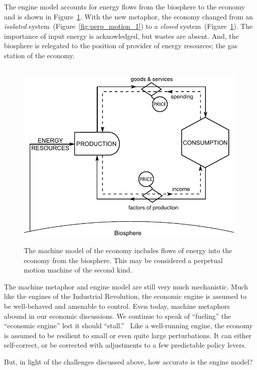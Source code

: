 The engine model accounts for energy flows from the biosphere 
to the economy and is shown in Figure~\ref{fig:perp_motion_2}.
With the new metaphor, the economy changed from 
an \emph{isolated} system~(Figure~\ref{fig:perp_motion_1}) to 
a \emph{closed} system~(Figure~\ref{fig:perp_motion_2}). 
The importance of input energy is acknowledged, 
but wastes are absent.
And, the biosphere is relegated to the position
of provider of energy resources;
the gas station of the economy.\cite{Norgaard2010}

\begin{figure}[H]
\centering\
\includegraphics[width=\linewidth]{Part_0/Chapter_Introduction/images/Perpetual_motion_2.pdf}
\caption[The machine model]{The machine model of the economy includes
flows of energy into the economy from the biosphere.
This may be considered a perpetual motion machine 
of the second kind.}
\label{fig:perp_motion_2}
\end{figure}

The machine metaphor and engine model are still very much mechanistic.
Much like the engines of the Industrial Revolution,
the economic engine is assumed to be well-behaved and amenable to control.
Even today, machine metaphors abound in our economic discussions.
We continue to speak of ``fueling'' the ``economic engine'' 
lest it should ``stall.''~\cite{Liu2012}
Like a well-running engine, the economy is assumed 
to be resilient to small or even quite large perturbations.  
It can either self-correct, 
or be corrected with adjustments to
a few predictable policy levers.

But, in light of the challenges discussed above,
how accurate is the engine model?

